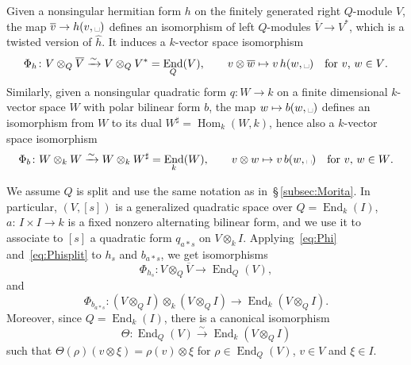 \documentclass{amsart}
\DeclareMathOperator{\End}{End}
\DeclareMathOperator{\Hom}{Hom}
\theoremstyle{remark}
\begin{document}
Given a nonsingular hermitian form $h$ on the finitely generated right
$Q$-module $V$, the map 
$\overline v\to 
h(v,\mbox{\textvisiblespace})$ defines an isomorphism of left
$Q$-modules $\overline V\to V^*$, which is a twisted version of
$\widehat h$. It induces a $k$-vector space isomorphism
\begin{equation}
  \label{eq:Phi}
  \Phi_{h}\colon V\otimes_Q\overline V \xrightarrow{\sim}
  V\otimes_QV^* = \End_Q(V), \qquad
  v\otimes\overline w\mapsto v\,h(w,\mbox{\textvisiblespace})
  \quad\text{for $v$, $w\in V$.}
  \end{equation}
Similarly, given a nonsingular quadratic form $q\colon W\to k$ on a
finite dimensional $k$-vector space $W$ 
with polar bilinear form $b$, the map $w\mapsto
b(w,\mbox{\textvisiblespace})$ defines an isomorphism from $W$ to its
dual $W^\sharp=\Hom_k(W,k)$, hence also a $k$-vector space
isomorphism
\begin{equation}
\label{eq:Phisplit}
  \Phi_b\colon W\otimes_kW \xrightarrow{\sim} W\otimes_kW^\sharp =
  \End_k(W), \qquad
  v\otimes w \mapsto v\,b(w,\mbox{\textvisiblespace})
  \quad\text{for $v$, $w\in W$.}
\end{equation}

We assume $Q$ is split and use the same notation as
in~\S\,\ref{subsec:Morita}. In particular,  
$(V,[s])$ is a generalized quadratic space over $Q=\End_k(I)$, $a:\,I\times I\rightarrow k$ is a fixed nonzero alternating bilinear form, and we use it to associate to $[s]$ a quadratic form $q_{a* s}$ on $V\otimes_k I$. Applying~\eqref{eq:Phi} and~\eqref{eq:Phisplit} to $h_s$ and $b_{a*s}$, we get isomorphisms 
\[\Phi_{h_s}\colon V\otimes_Q\overline V\rightarrow \End_Q(V),\] 
and 
\[
  \Phi_{b_{a*s}}\colon (V\otimes _Q I)\otimes _k(V\otimes_Q
  I)\rightarrow \End_k(V\otimes_Q I).
\]
Moreover, since $Q=\End_k(I)$, there is a canonical isomorphism 
\begin{equation}
  \label{eq:Thetadef}
  \Theta\colon \End_Q(V)\xrightarrow{\sim} \End_k(V\otimes_QI)
\end{equation}
such that $
  \Theta(\rho)(v\otimes\xi) = \rho(v)\otimes\xi$ for
    $\rho\in\End_Q(V)$, $v\in V$ and $\xi\in I$.
\end{document}
